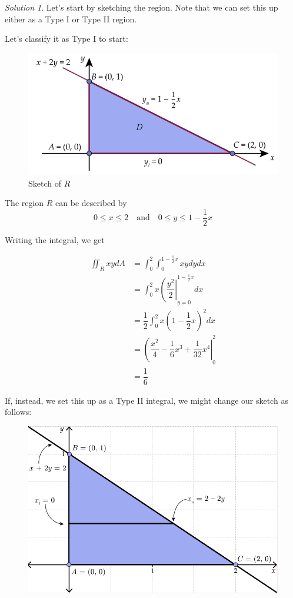 \documentclass[
]{book}
\theoremstyle{definition}
\theoremstyle{definition}
\theoremstyle{definition}
\theoremstyle{definition}
\theoremstyle{remark}
\newtheorem*{solution}{Solution}
\begin{document}
\begin{solution}

Let's start by sketching the region. Note that we can set this up either as a Type I or Type II region.

Let's classify it as Type I to start:

\begin{figure}

{\centering \includegraphics[width=0.75\linewidth]{images/lec-11-1} 

}

\caption{Sketch of $R$}\label{fig:unnamed-chunk-20}
\end{figure}

The region \(R\) can be described by \[0\leq x \leq 2 \quad \mbox{and}\quad 0\leq y\leq 1-\dfrac{1}{2}x\]

Writing the integral, we get

\begin{align*}
\displaystyle \iint_R xy dA & = \int_0^2\int_0^{1-\frac{1}{2}x}xy dy dx \\
&= \int_0^2 x\left (\dfrac{y^2}{2}\right |_{y=0}^{1-\frac{1}{2}x} dx\\
&= \dfrac{1}{2}\int_0^2 x\left (1-\dfrac{1}{2}x \right)^2 dx\\
&= \left ( \dfrac{x^2}{4}-\dfrac{1}{6}x^3+\dfrac{1}{32}x^4 \right|_{0}^2\\
&=\dfrac{1}{6}
\end{align*}

If, instead, we set this up as a Type II integral, we might change our sketch as follows:

\begin{figure}

{\centering \includegraphics[width=0.75\linewidth]{images/lec-11-2} 

}
\end{figure}
\end{solution}
\end{document}
